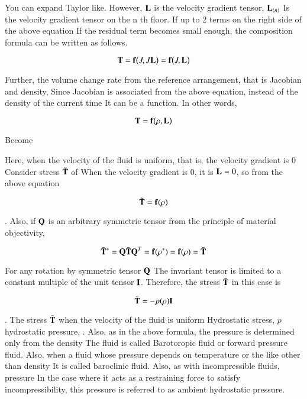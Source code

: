 You can expand Taylor like.
However, $\mathbf{L}$ is the velocity gradient tensor, $\mathbf{L}_{(n)}$
Is the velocity gradient tensor on the n th floor. If up to 2 terms on the right side of the above equation
If the residual term becomes small enough, the composition formula can be written as follows.

\begin{equation}
{\mathbf{T}}  =  {\mathbf{f}}\big(J,J{\mathbf{L}}\big)\\  				=  {\mathbf{f}}\big(J,{\mathbf{L}}\big)
\end{equation}

Further, the volume change rate from the reference arrangement, that is Jacobian and density,
Since Jacobian is associated from the above equation, instead of the density of the current time
It can be a function. In other words,

\begin{equation}
{\mathbf{T}}={\mathbf{f}}\big(\rho,{\mathbf{L}}\big)
\end{equation}

Become

Here, when the velocity of the fluid is uniform, that is, the velocity gradient is 0
Consider stress $\tilde{\mathbf{T}}$ of
When the velocity gradient is 0, it is $\mathbf{L}=0$, so from the above equation

\begin{equation}
\tilde{\mathbf{T}}={\mathbf{f}}(\rho)
\end{equation}


. Also, if $\mathbf{Q}$ is an arbitrary symmetric tensor from the principle of material objectivity,

\begin{equation}
\tilde{\mathbf{T}}^*  =  {\mathbf{Q}} \tilde{\mathbf{T}} {\mathbf{Q}^{T}}  =  {\mathbf{f}}(\rho^*)  =  {\mathbf{f}}(\rho)  =  \tilde{\mathbf{T}}
\end{equation}

For any rotation by symmetric tensor $\mathbf{Q}$
The invariant tensor is limited to a constant multiple of the unit tensor $\mathbf{I}$.
Therefore, the stress $\tilde{\mathbf{T}}$ in this case is

\begin{equation}
\tilde{\mathbf{T}}=-p(\rho){\mathbf{I}}
\end{equation}

. The stress $\tilde{\mathbf{T}}$ when the velocity of the fluid is uniform
Hydrostatic stress, $p$ hydrostatic pressure,
. Also, as in the above formula, the pressure is determined only from the density
The fluid is called Barotoropic fluid or forward pressure fluid.
Also, when a fluid whose pressure depends on temperature or the like other than density
It is called baroclinic fluid. Also, as with incompressible fluids, pressure
In the case where it acts as a restraining force to satisfy incompressibility, this pressure is referred to as ambient hydrostatic pressure.

